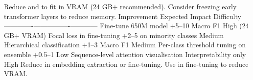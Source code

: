 Reduce  and  to fit in VRAM (24 GB+ recommended).\markdownRendererOlItemEnd 
{}Consider freezing early transformer layers to reduce memory.\markdownRendererOlItemEnd 
\markdownRendererOlEndTight \markdownRendererInterblockSeparator
{}
\markdownRendererSectionEnd \markdownRendererSectionBegin
{}\markdownRendererInterblockSeparator
{}\markdownRendererPipe{} Improvement \markdownRendererPipe{} Expected Impact \markdownRendererPipe{} Difficulty \markdownRendererPipe{}\markdownRendererSoftLineBreak
{}\markdownRendererPipe{}-------------\markdownRendererPipe{}----------------\markdownRendererPipe{}------------\markdownRendererPipe{}\markdownRendererSoftLineBreak
{}\markdownRendererPipe{} Fine-tune 650M model \markdownRendererPipe{} +5–10 \markdownRendererPercentSign{} Macro F1 \markdownRendererPipe{} High (24 GB+ VRAM) \markdownRendererPipe{}\markdownRendererSoftLineBreak
{}\markdownRendererPipe{} Focal loss in fine-tuning \markdownRendererPipe{} +2–5 \markdownRendererPercentSign{} on minority classes \markdownRendererPipe{} Medium \markdownRendererPipe{}\markdownRendererSoftLineBreak
{}\markdownRendererPipe{} Hierarchical classification \markdownRendererPipe{} +1–3 \markdownRendererPercentSign{} Macro F1 \markdownRendererPipe{} Medium \markdownRendererPipe{}\markdownRendererSoftLineBreak
{}\markdownRendererPipe{} Per-class threshold tuning on ensemble \markdownRendererPipe{} +0.5–1 \markdownRendererPercentSign{} \markdownRendererPipe{} Low \markdownRendererPipe{}\markdownRendererSoftLineBreak
{}\markdownRendererPipe{} Sequence-level attention visualisation \markdownRendererPipe{} Interpretability only \markdownRendererPipe{} High \markdownRendererPipe{}\markdownRendererInterblockSeparator
{}\markdownRendererThematicBreak{}\markdownRendererInterblockSeparator
{}
\markdownRendererSectionEnd 
\markdownRendererSectionEnd \markdownRendererSectionBegin
{}\markdownRendererInterblockSeparator
{}\markdownRendererSectionBegin
{}\markdownRendererInterblockSeparator
{}\markdownRendererUlBeginTight
\markdownRendererUlItem Reduce  in embedding extraction or fine-tuning.\markdownRendererUlItemEnd 
\markdownRendererUlItem Use  in fine-tuning to reduce VRAM.\markdownRendererUlItemEnd 
